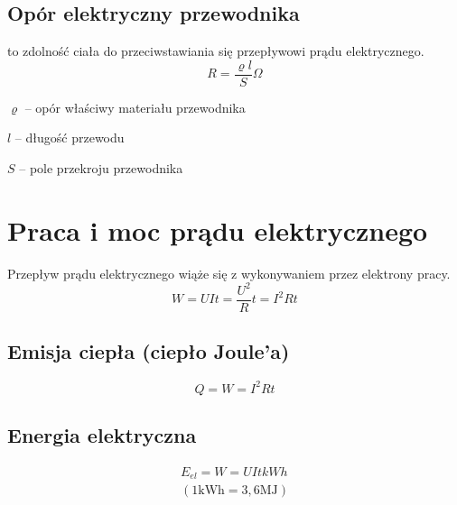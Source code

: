     \subsection{Opór elektryczny przewodnika}
      \begin{definition}
         to zdolność ciała do przeciwstawiania się przepływowi prądu elektrycznego.
        \begin{equation*}
          R = \frac{\varrho l}{S} \unit{\Omega}
        \end{equation*}
        \begin{symbols}
          \item $\varrho$ -- opór właściwy materiału przewodnika
          \item $l$ -- długość przewodu
          \item $S$ -- pole przekroju przewodnika
        \end{symbols}
      \end{definition}

  \section{Praca i moc prądu elektrycznego}
    Przepływ prądu elektrycznego wiąże się z wykonywaniem przez elektrony pracy.
    \begin{equation}\label{praca el}
      \boxed{W = UIt = \frac{U^2}{R}t = I^2Rt}
    \end{equation}

    \subsection{Emisja ciepła (ciepło Joule'a)}
      \begin{equation*}
        Q = W = I^2Rt
      \end{equation*}

    \subsection{Energia elektryczna}
      \begin{gather*}
        E_{el} = W = UIt \unit{kWh}\\
        (1\mathrm{kWh} = 3,6\mathrm{MJ})
      \end{gather*}

